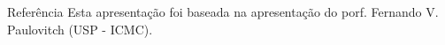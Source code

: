 \documentclass{beamer}
\begin{document}
\begin{frame}

	\begin{block}{Referência}
		Esta apresentação foi baseada na apresentação do porf. Fernando V. Paulovitch (USP - ICMC).
	\end{block}
	
\end{frame}

\end{document}
